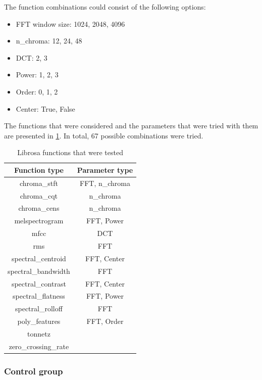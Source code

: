 The function combinations could consist of the following options:

\begin{itemize}
    \item FFT window size: 1024, 2048, 4096
    \item n\_chroma: 12, 24, 48
    \item DCT: 2, 3
    \item Power: 1, 2, 3
    \item Order: 0, 1, 2
    \item Center: True, False
\end{itemize}{}

The functions that were considered and the parameters that were tried with them are presented in \cref{tab:ex1dataset}.
In total, 67 possible combinations were tried.

\begin{table}[ht]
    \centering
    \begin{tabular}{|c|c|}
        \hline
        Function type & Parameter type\\ \hline
        chroma\_stft & FFT, n\_chroma\\ \hline
        chroma\_cqt & n\_chroma\\ \hline
        chroma\_cens & n\_chroma\\ \hline
        melspectrogram & FFT, Power\\ \hline
        mfcc & DCT\\ \hline
        rms & FFT\\ \hline
        spectral\_centroid & FFT, Center\\ \hline
        spectral\_bandwidth & FFT\\ \hline
        spectral\_contrast & FFT, Center\\ \hline
        spectral\_flatness & FFT, Power\\ \hline
        spectral\_rolloff & FFT\\ \hline
        poly\_features & FFT, Order\\ \hline
        tonnetz & \\ \hline
        zero\_crossing\_rate & \\ \hline
    \end{tabular}
    \caption{Librosa functions that were tested}
    \label{tab:ex1dataset}
\end{table}

\subsubsection{Control group}

